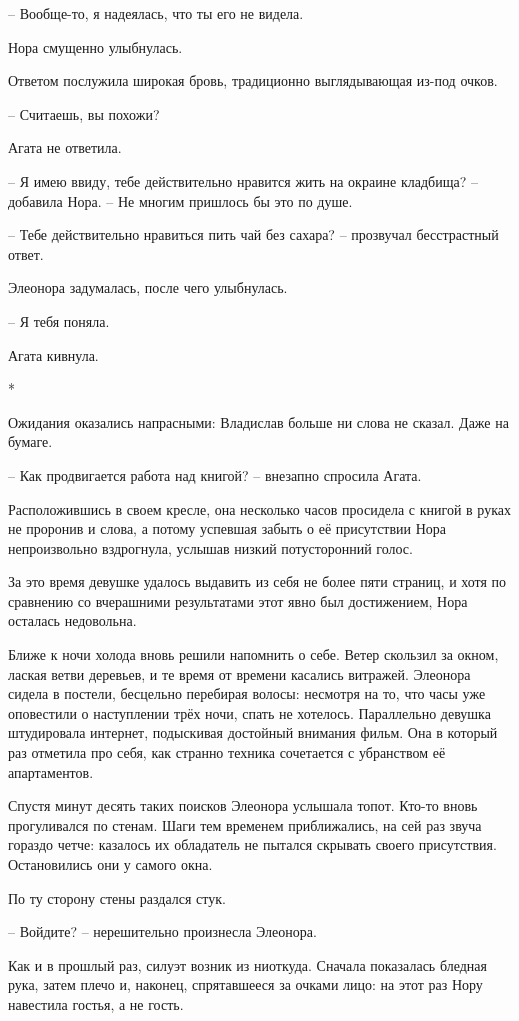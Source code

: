 \documentclass[
  a5paperpaper,
  DIV=11,
  numbers=noendperiod]{scrreprt}
\begin{document}
-- Вообще-то, я надеялась, что ты его не видела.

Нора смущенно улыбнулась.

Ответом послужила широкая бровь, традиционно выглядывающая из-под очков.

-- Считаешь, вы похожи?

Агата не ответила.

-- Я имею ввиду, тебе действительно нравится жить на окраине кладбища?
-- добавила Нора. -- Не многим пришлось бы это по душе.

-- Тебе действительно нравиться пить чай без сахара? -- прозвучал
бесстрастный ответ.

Элеонора задумалась, после чего улыбнулась.

-- Я тебя поняла.

Агата кивнула.

*

Ожидания оказались напрасными: Владислав больше ни слова не сказал. Даже
на бумаге.

-- Как продвигается работа над книгой? -- внезапно спросила Агата.

Расположившись в своем кресле, она несколько часов просидела с книгой в
руках не проронив и слова, а потому успевшая забыть о её присутствии
Нора непроизвольно вздрогнула, услышав низкий потусторонний голос.

За это время девушке удалось выдавить из себя не более пяти страниц, и
хотя по сравнению со вчерашними результатами этот явно был достижением,
Нора осталась недовольна.

Ближе к ночи холода вновь решили напомнить о себе. Ветер скользил за
окном, лаская ветви деревьев, и те время от времени касались витражей.
Элеонора сидела в постели, бесцельно перебирая волосы: несмотря на то,
что часы уже оповестили о наступлении трёх ночи, спать не хотелось.
Параллельно девушка штудировала интернет, подыскивая достойный внимания
фильм. Она в который раз отметила про себя, как странно техника
сочетается с убранством её апартаментов.

Спустя минут десять таких поисков Элеонора услышала топот. Кто-то вновь
прогуливался по стенам. Шаги тем временем приближались, на сей раз звуча
гораздо четче: казалось их обладатель не пытался скрывать своего
присутствия. Остановились они у самого окна.

По ту сторону стены раздался стук.

-- Войдите? -- нерешительно произнесла Элеонора.

Как и в прошлый раз, силуэт возник из ниоткуда. Сначала показалась
бледная рука, затем плечо и, наконец, спрятавшееся за очками лицо: на
этот раз Нору навестила гостья, а не гость.
\end{document}
